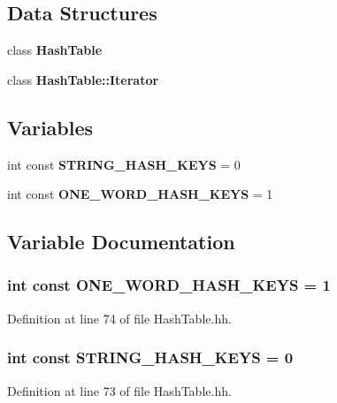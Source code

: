 \subsection*{Data Structures}
\begin{DoxyCompactItemize}
\item 
class {\bf Hash\+Table}
\item 
class {\bf Hash\+Table\+::\+Iterator}
\end{DoxyCompactItemize}
\subsection*{Variables}
\begin{DoxyCompactItemize}
\item 
int const {\bf S\+T\+R\+I\+N\+G\+\_\+\+H\+A\+S\+H\+\_\+\+K\+E\+Y\+S} = 0
\item 
int const {\bf O\+N\+E\+\_\+\+W\+O\+R\+D\+\_\+\+H\+A\+S\+H\+\_\+\+K\+E\+Y\+S} = 1
\end{DoxyCompactItemize}


\subsection{Variable Documentation}
\subsubsection[{O\+N\+E\+\_\+\+W\+O\+R\+D\+\_\+\+H\+A\+S\+H\+\_\+\+K\+E\+Y\+S}]{\setlength{\rightskip}{0pt plus 5cm}int const O\+N\+E\+\_\+\+W\+O\+R\+D\+\_\+\+H\+A\+S\+H\+\_\+\+K\+E\+Y\+S = 1}\label{HashTable_8hh_a3d2bd9400a3862b4891800778e82c7dd}


Definition at line 74 of file Hash\+Table.\+hh.

\subsubsection[{S\+T\+R\+I\+N\+G\+\_\+\+H\+A\+S\+H\+\_\+\+K\+E\+Y\+S}]{\setlength{\rightskip}{0pt plus 5cm}int const S\+T\+R\+I\+N\+G\+\_\+\+H\+A\+S\+H\+\_\+\+K\+E\+Y\+S = 0}\label{HashTable_8hh_a5975d82c2be8c3a5b754d8011cb0e42f}


Definition at line 73 of file Hash\+Table.\+hh.

